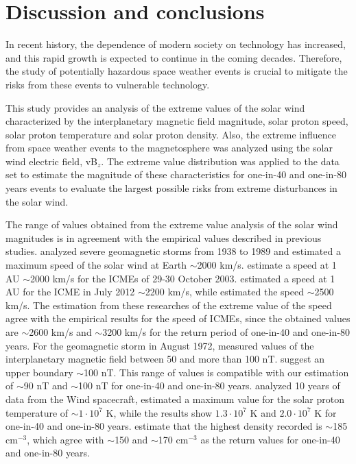 \documentclass{article}
\begin{document}
\section{Discussion and conclusions} \label{sec:conclusions}

In recent history, the dependence of modern society on technology has increased, and this rapid growth is expected to continue in the coming decades. Therefore, the study of potentially hazardous space weather events is crucial to mitigate the risks from these events to vulnerable technology.

This study provides an analysis of the extreme values of the solar wind characterized by the interplanetary magnetic field magnitude, solar proton speed, solar proton temperature and solar proton density. Also, the extreme influence from space weather events to the magnetosphere was analyzed using the solar wind electric field, vB$_{z}$. The extreme value distribution was applied to the data set to estimate the magnitude of these characteristics for one-in-40 and one-in-80 years events to evaluate the largest possible risks from extreme disturbances in the solar wind.

The range of values obtained from the extreme value analysis of the solar wind magnitudes is in agreement with the empirical values described in  previous studies.
\cite{Cliver_1990_CME_speed} analyzed severe geomagnetic storms from 1938 to 1989 and estimated a maximum speed of the solar wind at Earth $\sim$2000 km/s. \cite{Skoug_2004_CME} estimate a speed at 1 AU $\sim$2000 km/s for the ICMEs of 29-30 October 2003.
\cite{Liu_2014_extreme_events} estimated a speed at 1 AU for the ICME in July 2012 $\sim$2200 km/s, while \cite{Baker_2013_extremes} estimated the speed $\sim$2500 km/s.
The estimation from these researches of the extreme value of the speed agree with the empirical results for the speed of ICMEs, since the obtained values are $\sim$2600 km/s and $\sim$3200 km/s for the return period of one-in-40 and one-in-80 years. 
For the geomagnetic storm in August 1972, \cite{Duston_1997_extreme_Mag_field} measured values of the interplanetary magnetic field between 50 and more than 100 nT. \cite{Liu_2020_ICMEs} suggest an upper boundary $\sim$100 nT. This range of values is compatible with our estimation of $\sim$90 nT and $\sim$100 nT for one-in-40 and one-in-80 years.
\cite{Wilson_2018_Statistical_Solar_Wind} analyzed 10 years of data from the Wind spacecraft, estimated a maximum value for the solar proton temperature of $\sim1\cdot10^{7}$ K, while the results show $1.3\cdot10^{7}$ K and $2.0\cdot10^{7}$ K for one-in-40 and one-in-80 years.
\cite{Crooker_2000_Extreme_events} estimate that the highest density recorded is $\sim$185 cm$^{-3}$, which agree with $\sim$150 and $\sim$170 cm$^{-3}$ as the return values for one-in-40 and one-in-80 years.
\end{document}
